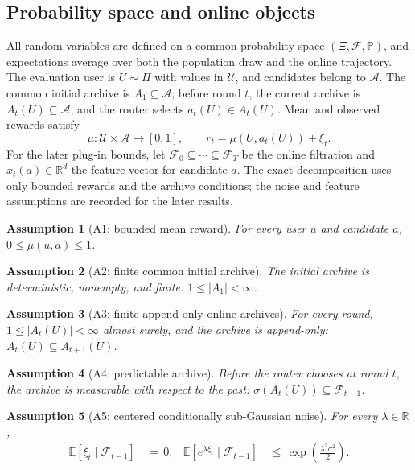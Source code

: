 \documentclass{article} %
\newtheorem{assumption}{Assumption}
\begin{document}
\subsection{Probability space and online objects}

All random variables are defined on a common probability space
\((\Xi,\mathcal F,\mathbb P)\), and expectations average over both the
population draw and the online trajectory.  The evaluation user is
\(U\sim\Pi\) with values in \(\mathcal U\), and candidates belong to
\(\mathcal A\).  The common initial archive is \(A_1\subseteq\mathcal A\);
before round \(t\), the current archive is \(A_t(U)\subseteq\mathcal A\), and
the router selects \(a_t(U)\in A_t(U)\).  Mean and observed rewards satisfy
\begin{equation}
\mu:\mathcal U\times\mathcal A\to[0,1],
\qquad
r_t=\mu(U,a_t(U))+\xi_t.
\end{equation}
For the later plug-in bounds, let
\(\mathcal F_0\subseteq\cdots\subseteq\mathcal F_T\) be the online filtration
and \(x_t(a)\in\mathbb R^d\) the feature vector for candidate \(a\).  The exact
decomposition uses only bounded rewards and the archive conditions; the noise
and feature assumptions are recorded for the later results.

\begin{assumption}[A1: bounded mean reward]
\label{ass:app-bounded}
For every user \(u\) and candidate \(a\),
\(0\leq\mu(u,a)\leq 1\).
\end{assumption}

\begin{assumption}[A2: finite common initial archive]
\label{ass:app-finite-initial}
The initial archive is deterministic, nonempty, and finite:
\(1\leq |A_1|<\infty\).
\end{assumption}

\begin{assumption}[A3: finite append-only online archives]
\label{ass:app-append-only}
For every round, \(1\leq |A_t(U)|<\infty\) almost surely, and the archive is
append-only: \(A_t(U)\subseteq A_{t+1}(U)\).
\end{assumption}

\begin{assumption}[A4: predictable archive]
\label{ass:app-predictable}
Before the router chooses at round \(t\), the archive is measurable with
respect to the past: \(\sigma(A_t(U))\subseteq\mathcal F_{t-1}\).
\end{assumption}

\begin{assumption}[A5: centered conditionally sub-Gaussian noise]
\label{ass:app-noise}
For every \(\lambda\in\mathbb R\),
\begin{equation}
\begin{aligned}
\mathbb E[\xi_t\mid\mathcal F_{t-1}] &\,=\,0, &
\mathbb E\!\left[e^{\lambda\xi_t}\mid\mathcal F_{t-1}\right]
&\,\leq\,\exp\!\left(\frac{\lambda^2\sigma^2}{2}\right).
\end{aligned}
\end{equation}
\end{assumption}
\end{document}
